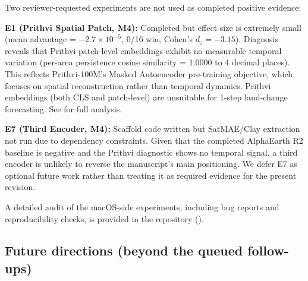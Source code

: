 \documentclass{article}
\begin{document}
Two reviewer-requested experiments are not used as completed positive evidence:

\textbf{E1 (Prithvi Spatial Patch, M4):} Completed but effect size is extremely small (mean advantage = $-2.7\times 10^{-5}$, 0/16 win, Cohen's $d_z = -3.15$). Diagnosis reveals that Prithvi patch-level embeddings exhibit no measurable temporal variation (per-area persistence cosine similarity = 1.0000 to 4 decimal places). This reflects Prithvi-100M's Masked Autoencoder pre-training objective, which focuses on spatial reconstruction rather than temporal dynamics. Prithvi embeddings (both CLS and patch-level) are unsuitable for 1-step land-change forecasting. See  for full analysis.

\textbf{E7 (Third Encoder, M4):} Scaffold code written but SatMAE/Clay extraction not run due to dependency constraints. Given that the completed AlphaEarth R2 baseline is negative and the Prithvi diagnostic shows no temporal signal, a third encoder is unlikely to reverse the manuscript's main positioning. We defer E7 as optional future work rather than treating it as required evidence for the present revision.

A detailed audit of the macOS-side experiments, including bug reports and reproducibility checks, is provided in the repository ().

\subsection{Future directions (beyond the queued follow-ups)}
\label{sec:future}
\end{document}
